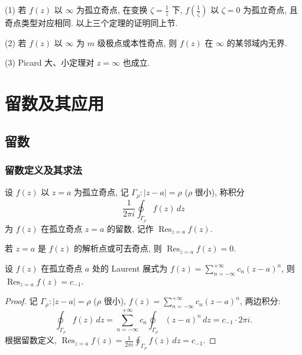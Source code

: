 \documentclass[theorem=false,mathfont=none,openany,sub3section]{easybook}
\begin{document}
\begin{remark}
  (1) 若 $f(z)$ 以 $\infty$ 为孤立奇点, 在变换 $\zeta=\frac{1}{z}$ 下, $f(\frac{1}{\zeta})$ 以 $\zeta=0$ 为孤立奇点, 且奇点类型对应相同. 以上三个定理的证明同上节.

  (2) 若 $f(z)$ 以 $\infty$ 为 $m$ 级极点或本性奇点, 则 $f(z)$ 在 $\infty$ 的某邻域内无界.

  (3) Picard 大、小定理对 $z=\infty$ 也成立.
\end{remark}

\newpage

\chapter{留数及其应用}

\section{留数}

\subsection{留数定义及其求法}

\begin{definition}
  设 $f(z)$ 以 $z=a$ 为孤立奇点, 记 $\Gamma_{\rho}:|z-a|=\rho$ ($\rho$ 很小), 称积分
  \[
  \frac{1}{2\pi i}\oint_{\Gamma_{\rho}}f(z)\,dz
  \]
  为 $f(z)$ 在孤立奇点 $z=a$ 的留数, 记作 $\operatorname{Res}_{z=a}f(z)$.
\end{definition}

\begin{remark}
  若 $z=a$ 是 $f(z)$ 的解析点或可去奇点, 则 $\operatorname{Res}_{z=a}f(z)=0$.
\end{remark}

\begin{theorem}
  设 $f(z)$ 在孤立奇点 $a$ 处的 Laurent 展式为 $f(z)=\sum_{n=-\infty}^{+\infty}c_{n}(z-a)^{n}$,
  则 $\operatorname{Res}_{z=a}f(z)=c_{-1}$.
\end{theorem}

\begin{proof}
  记 $\Gamma_{\rho}:|z-a|=\rho$ ($\rho$ 很小), $f(z)=\sum_{n=-\infty}^{+\infty}c_{n}(z-a)^{n}$, 两边积分:
  \[
  \oint_{\Gamma_{\rho}}f(z)\,dz=\sum_{n=-\infty}^{+\infty}c_{n}\oint_{\Gamma_{\rho}}(z-a)^{n}\,dz=c_{-1}\cdot2\pi i.
  \]
  根据留数定义, $\operatorname{Res}_{z=a}f(z)=\frac{1}{2\pi i}\oint_{\Gamma_{\rho}}f(z)\,dz=c_{-1}$.
\end{proof}
\end{document}
